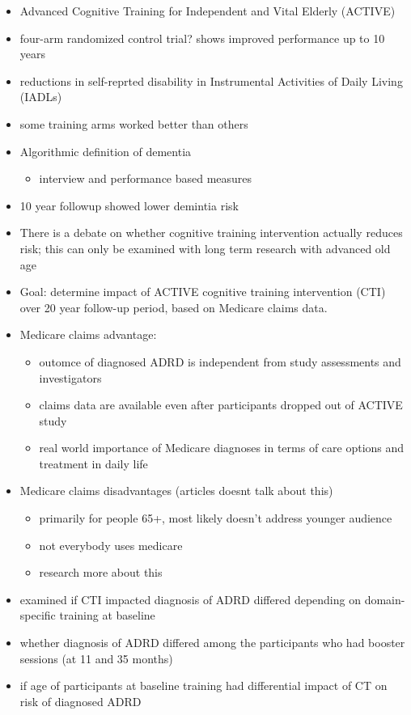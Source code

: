 \documentclass[11pt]{article}
\begin{document}
\begin{itemize}
\item Advanced Cognitive Training for Independent and Vital Elderly (ACTIVE)
\item four-arm randomized control trial? shows improved performance up to 10 years
\item reductions in self-reprted disability in Instrumental Activities of Daily Living (IADLs)
\item some training arms worked better than others

\item Algorithmic definition of dementia
\begin{itemize}
\item interview and performance based measures
\end{itemize}
\item 10 year followup showed lower demintia risk
\item There is a debate on whether cognitive training intervention actually reduces risk; this can only be examined with long term research with advanced old age

\item Goal: determine impact of ACTIVE cognitive training intervention (CTI) over 20 year follow-up period, based on Medicare claims data.
\item Medicare claims advantage:
\begin{itemize}
\item outomce of diagnosed ADRD is independent from study assessments and investigators
\item claims data are available even after participants dropped out of ACTIVE study
\item real world importance of Medicare diagnoses in terms of care options and treatment in daily life
\end{itemize}
\item Medicare claims disadvantages (articles doesnt talk about this)
\begin{itemize}
\item primarily for people 65+, most likely doesn't address younger audience
\item not everybody uses medicare
\item research more about this
\end{itemize}

\item examined if CTI impacted diagnosis of ADRD differed depending on domain-specific training at baseline
\item whether diagnosis of ADRD differed among the participants who had booster sessions (at 11 and 35 months)
\item if age of participants at baseline training had differential impact of CT on risk of diagnosed ADRD
\end{itemize}
\end{document}
